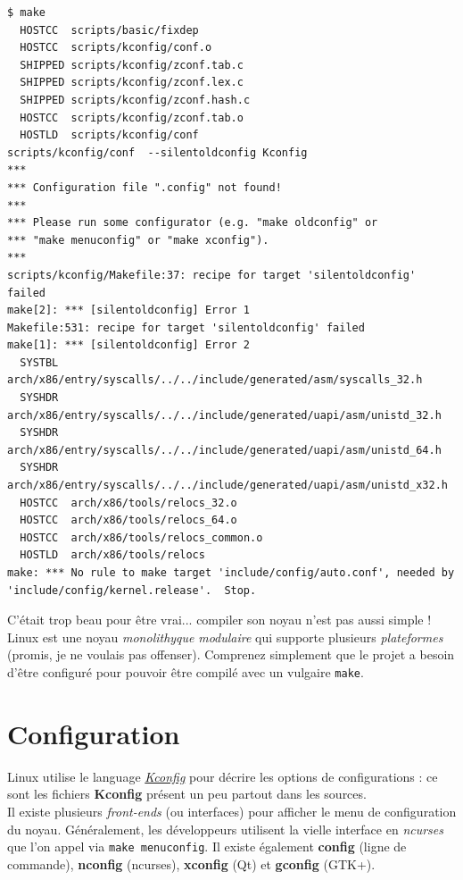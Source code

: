 \documentclass[a4paper]{article}
\begin{document}
\begin{verbatim}
$ make
  HOSTCC  scripts/basic/fixdep
  HOSTCC  scripts/kconfig/conf.o
  SHIPPED scripts/kconfig/zconf.tab.c
  SHIPPED scripts/kconfig/zconf.lex.c
  SHIPPED scripts/kconfig/zconf.hash.c
  HOSTCC  scripts/kconfig/zconf.tab.o
  HOSTLD  scripts/kconfig/conf
scripts/kconfig/conf  --silentoldconfig Kconfig
***
*** Configuration file ".config" not found!
***
*** Please run some configurator (e.g. "make oldconfig" or
*** "make menuconfig" or "make xconfig").
***
scripts/kconfig/Makefile:37: recipe for target 'silentoldconfig' failed
make[2]: *** [silentoldconfig] Error 1
Makefile:531: recipe for target 'silentoldconfig' failed
make[1]: *** [silentoldconfig] Error 2
  SYSTBL  arch/x86/entry/syscalls/../../include/generated/asm/syscalls_32.h
  SYSHDR  arch/x86/entry/syscalls/../../include/generated/uapi/asm/unistd_32.h
  SYSHDR  arch/x86/entry/syscalls/../../include/generated/uapi/asm/unistd_64.h
  SYSHDR  arch/x86/entry/syscalls/../../include/generated/uapi/asm/unistd_x32.h
  HOSTCC  arch/x86/tools/relocs_32.o
  HOSTCC  arch/x86/tools/relocs_64.o
  HOSTCC  arch/x86/tools/relocs_common.o
  HOSTLD  arch/x86/tools/relocs
make: *** No rule to make target 'include/config/auto.conf', needed by 'include/config/kernel.release'.  Stop.
\end{verbatim}

C'était trop beau pour être vrai... compiler son noyau n'est pas aussi simple ! Linux est une noyau \textit{monolithyque} \textit{modulaire} qui supporte plusieurs \textit{plateformes} (promis, je ne voulais pas offenser). Comprenez simplement que le projet a besoin d'être configuré pour pouvoir être compilé avec un vulgaire \lstset{language=sh}\lstinline{make}.\\

\section{Configuration}

Linux utilise le language \textit{\href{https://www.kernel.org/doc/Documentation/kbuild/kconfig-language.txt}{Kconfig}} pour décrire les options de configurations : ce sont les fichiers \textbf{Kconfig} présent un peu partout dans les sources.\\

Il existe plusieurs \textit{front-ends} (ou interfaces) pour afficher le menu de configuration du noyau. Généralement, les développeurs utilisent la vielle interface en \textit{ncurses} que l'on appel via \lstset{language=sh}\lstinline{make menuconfig}. Il existe également \textbf{config} (ligne de commande), \textbf{nconfig} (ncurses), \textbf{xconfig} (Qt) et \textbf{gconfig} (GTK+).\\
\end{document}
